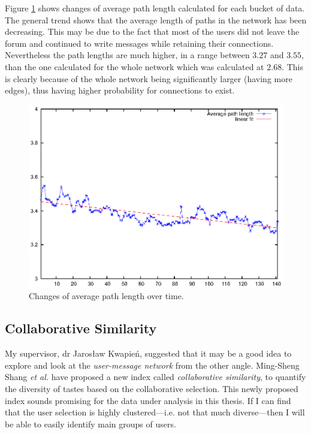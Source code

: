     Figure \ref{fig:avg_path} shows changes of average path length calculated for each bucket of data. The general trend shows that the average length of paths in the network has been decreasing. This may be due to the fact that most of the users did not leave the forum and continued to write messages while retaining their connections. Nevertheless the path lengths are much higher, in a range between $3.27$ and $3.55$, than the one calculated for the whole network which was calculated at $2.68$. This is clearly because of the whole network being significantly larger (having more edges), thus having higher probability for connections to exist.
    \begin{figure}[H]
      \centering
      \includegraphics[width=\textwidth]{chapters/03_implementation/avg_path}
      \caption{Changes of average path length over time.}
      \label{fig:avg_path}
    \end{figure}

  \subsection{Collaborative Similarity}
    
    My supervisor, dr Jarosław Kwapień, suggested that it may be a good idea to explore and look at the \emph{user-message network} from the other angle. Ming-Sheng Shang \textit{et al.} have proposed a new index called \emph{collaborative similarity}, to quantify the diversity of tastes based on the collaborative selection.\cite{Shang2010} This newly proposed index sounds promising for the data under analysis in this thesis. If I can find that the user selection is highly clustered---i.e. not that much diverse---then I will be able to easily identify main groups of users.
    
